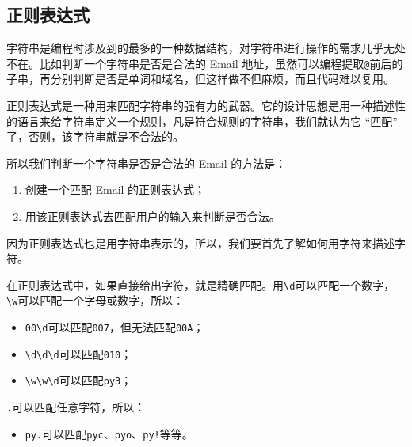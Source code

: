 \hypertarget{ux6b63ux5219ux8868ux8fbeux5f0f}{%
\subsection{正则表达式}\label{ux6b63ux5219ux8868ux8fbeux5f0f}}

字符串是编程时涉及到的最多的一种数据结构，对字符串进行操作的需求几乎无处不在。比如判断一个字符串是否是合法的
Email
地址，虽然可以编程提取\texttt{@}前后的子串，再分别判断是否是单词和域名，但这样做不但麻烦，而且代码难以复用。

正则表达式是一种用来匹配字符串的强有力的武器。它的设计思想是用一种描述性的语言来给字符串定义一个规则，凡是符合规则的字符串，我们就认为它
``匹配'' 了，否则，该字符串就是不合法的。

所以我们判断一个字符串是否是合法的 Email 的方法是：

\begin{enumerate}
\def\labelenumi{\arabic{enumi}.}
\item
  创建一个匹配 Email 的正则表达式；
\item
  用该正则表达式去匹配用户的输入来判断是否合法。
\end{enumerate}

因为正则表达式也是用字符串表示的，所以，我们要首先了解如何用字符来描述字符。

在正则表达式中，如果直接给出字符，就是精确匹配。用\texttt{\textbackslash{}d}可以匹配一个数字，\texttt{\textbackslash{}w}可以匹配一个字母或数字，所以：

\begin{itemize}
\item
  \texttt{\textquotesingle{}00\textbackslash{}d\textquotesingle{}}可以匹配\texttt{\textquotesingle{}007\textquotesingle{}}，但无法匹配\texttt{\textquotesingle{}00A\textquotesingle{}}；
\item
  \texttt{\textquotesingle{}\textbackslash{}d\textbackslash{}d\textbackslash{}d\textquotesingle{}}可以匹配\texttt{\textquotesingle{}010\textquotesingle{}}；
\item
  \texttt{\textquotesingle{}\textbackslash{}w\textbackslash{}w\textbackslash{}d\textquotesingle{}}可以匹配\texttt{\textquotesingle{}py3\textquotesingle{}}；
\end{itemize}

\texttt{.}可以匹配任意字符，所以：

\begin{itemize}
\item
  \texttt{\textquotesingle{}py.\textquotesingle{}}可以匹配\texttt{\textquotesingle{}pyc\textquotesingle{}}、\texttt{\textquotesingle{}pyo\textquotesingle{}}、\texttt{\textquotesingle{}py!\textquotesingle{}}等等。
\end{itemize}

